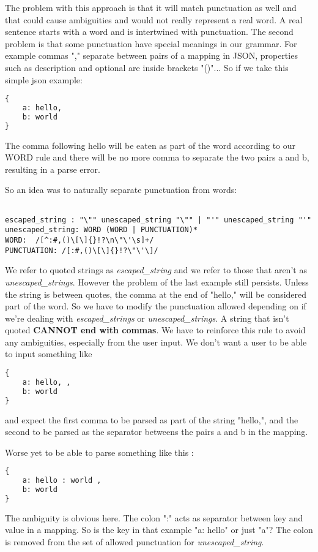 \documentclass[12pt]{article}
\begin{document}
The problem with this approach is that it will match punctuation as well and that could cause ambiguities and would not really represent a real word. A real sentence starts with a word and is intertwined with punctuation. The second problem is that some punctuation have special meanings in our grammar. For example commas "," separate between pairs of a mapping in JSON, properties such as description and optional are inside brackets "()"... So if we take this simple json example:

\begin{lstlisting}[language=Python]
{
    a: hello,
    b: world
}
\end{lstlisting}

The comma following hello will be eaten as part of the word according to our WORD rule and there will be no more comma to separate the two pairs a and b, resulting in a parse error.

So an idea was to naturally separate punctuation from words:

\begin{lstlisting}

escaped_string : "\"" unescaped_string "\"" | "'" unescaped_string "'"
unescaped_string: WORD (WORD | PUNCTUATION)*
WORD:  /[^:#,()\[\]{}!?\n\"\'\s]+/
PUNCTUATION: /[:#,()\[\]{}!?\"\'\]/
\end{lstlisting}

We refer to quoted strings as \emph{escaped\_string} and we refer to those that aren't as \emph{unescaped\_strings}. However the problem of the last example still persists. Unless the string is between quotes, the comma at the end of "hello," will be considered part of the word. So we have to modify the punctuation allowed depending on if we're dealing with \emph{escaped\_strings} or \emph{unescaped\_strings}. A string that isn't quoted \textbf{CANNOT end with commas}. We have to reinforce this rule to avoid any ambiguities, especially from the user input. We don't want a user to be able to input something like 
\begin{lstlisting}[language=Python]
{
    a: hello, ,
    b: world
}
\end{lstlisting}

and expect the first comma to be parsed as part of the string "hello,", and the second to be parsed as the separator betweens the pairs a and b in the mapping.

Worse yet to be able to parse something like this :
\begin{lstlisting}[language=Python]
{
    a: hello : world ,
    b: world
}
\end{lstlisting}
The ambiguity is obvious here. The colon ":" acts as separator between key and value in a mapping. So is the key in that example "a: hello" or just "a"? The colon is removed from the set of allowed punctuation for \emph{unescaped\_string}.
\end{document}

